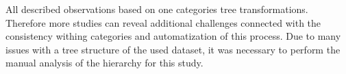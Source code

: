 All described observations based on one categories tree transformations. Therefore more studies can reveal additional challenges connected with the consistency withing categories and automatization of this process. Due to many issues with a tree structure of the used dataset, it was necessary to perform the manual analysis of the hierarchy for this study. 




